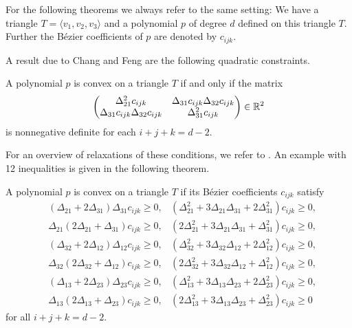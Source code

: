 For the following theorems  we always refer to the same setting: We have a triangle $T=\langle v_1, v_2,v_3 \rangle$ and a polynomial $p$ of degree $d$ defined on this triangle $T$. Further the B\'ezier coefficients of $p$ are denoted by $c_{ijk}$.
 
A result due to Chang and Feng \cite{CD1984} are the following quadratic constraints.
\begin{theorem} \label{thm: convex cond quadr}
	A polynomial $p$ is convex on a triangle $T$ if and only if the matrix
	\[
		\begin{pmatrix}
			\Delta_{21}^2 c_{ijk} & \Delta_{31} c_{ijk} \Delta_{32} c_{ijk}\\
			\Delta_{31}c_{ijk} \Delta_{32} c_{ijk} & \Delta_{31}^2 c_{ijk} 
		\end{pmatrix} \in \mathbb{R}^2
	\]
	is nonnegative definite for each $i + j + k =d-2 $.
\end{theorem}
For an overview of relaxations of these conditions, we refer to \cite{SS2010}. An example with 12 inequalities is given in the following theorem.
\begin{theorem}
\label{thm: convex cond on triangle}
	A polynomial $p$ is convex on a triangle $T$ if its B\'ezier coefficients $c_{ijk}$ satisfy
	\begin{align*}
		&(\Delta_{21} + 2\Delta_{31}) \Delta_{31} c_{ijk} \geq 0, 
		&   (\Delta_{21}^2 + 3\Delta_{21} \Delta_{31} + 2 \Delta_{31}^2) c_{ijk} \geq 0, \\
		& \Delta_{21}(2\Delta_{21} + \Delta_{31})  c_{ijk} \geq 0, 
		&   (2\Delta_{21}^2 + 3\Delta_{21} \Delta_{31} +  \Delta_{31}^2) c_{ijk} \geq 0, \\  
		&(\Delta_{32} + 2\Delta_{12}) \Delta_{12} c_{ijk} \geq 0, 
		&   (\Delta_{32}^2 + 3\Delta_{32} \Delta_{12} + 2 \Delta_{12}^2) c_{ijk} \geq 0, \\
		&\Delta_{32} (2\Delta_{32} + \Delta_{12}) c_{ijk} \geq 0, 
		&   (2\Delta_{32}^2 + 3\Delta_{32} \Delta_{12} +  \Delta_{12}^2) c_{ijk} \geq 0, \\  
		&(\Delta_{13} + 2\Delta_{23}) \Delta_{23} c_{ijk} \geq 0, 
		&   (\Delta_{13}^2 + 3\Delta_{13} \Delta_{23} + 2 \Delta_{23}^2) c_{ijk} \geq 0, \\
		& \Delta_{13}(2\Delta_{13} + \Delta_{23})  c_{ijk} \geq 0, 
		&   (2\Delta_{13}^2 + 3\Delta_{13} \Delta_{23} +  \Delta_{23}^2) c_{ijk} \geq 0   
	\end{align*}
	for all $i + j + k = d-2 $.
\end{theorem}
